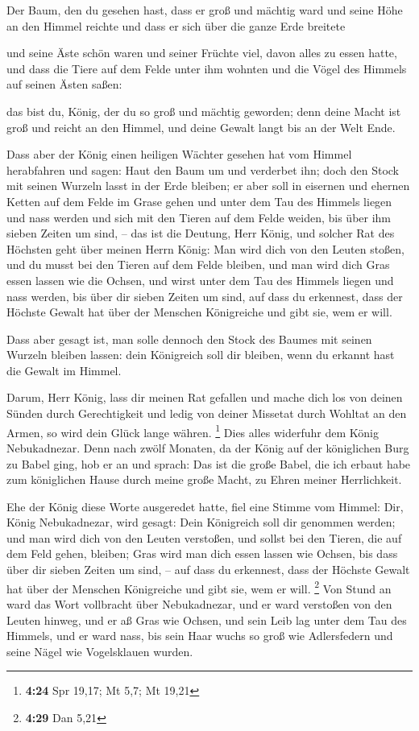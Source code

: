  Der Baum, den du gesehen hast, dass er groß und mächtig
ward und seine Höhe an den Himmel reichte und dass er sich über die
ganze Erde breitete

 und seine Äste schön waren und seiner Früchte viel,
davon alles zu essen hatte, und dass die Tiere auf dem Felde unter ihm
wohnten und die Vögel des Himmels auf seinen Ästen saßen:

 das bist du, König, der du so groß und mächtig geworden;
denn deine Macht ist groß und reicht an den Himmel, und deine Gewalt
langt bis an der Welt Ende.

 Dass aber der König einen heiligen Wächter gesehen hat
vom Himmel herabfahren und sagen: Haut den Baum um und verderbet ihn;
doch den Stock mit seinen Wurzeln lasst in der Erde bleiben; er aber
soll in eisernen und ehernen Ketten auf dem Felde im Grase gehen und
unter dem Tau des Himmels liegen und nass werden und sich mit den Tieren
auf dem Felde weiden, bis über ihm sieben Zeiten um sind, --
 das ist die Deutung, Herr König, und solcher Rat des
Höchsten geht über meinen Herrn König:  Man wird dich von
den Leuten stoßen, und du musst bei den Tieren auf dem Felde bleiben,
und man wird dich Gras essen lassen wie die Ochsen, und wirst unter dem
Tau des Himmels liegen und nass werden, bis über dir sieben Zeiten um
sind, auf dass du erkennest, dass der Höchste Gewalt hat über der
Menschen Königreiche und gibt sie, wem er will.

 Dass aber gesagt ist, man solle dennoch den Stock des
Baumes mit seinen Wurzeln bleiben lassen: dein Königreich soll dir
bleiben, wenn du erkannt hast die Gewalt im Himmel.

 Darum, Herr König, lass dir meinen Rat gefallen und
mache dich los von deinen Sünden durch Gerechtigkeit und ledig von
deiner Missetat durch Wohltat an den Armen, so wird dein Glück lange
währen. \footnote{\textbf{4:24} Spr 19,17; Mt 5,7; Mt 19,21}
 Dies alles widerfuhr dem König Nebukadnezar.
 Denn nach zwölf Monaten, da der König auf der
königlichen Burg zu Babel ging,  hob er an und sprach:
Das ist die große Babel, die ich erbaut habe zum königlichen Hause durch
meine große Macht, zu Ehren meiner Herrlichkeit.

 Ehe der König diese Worte ausgeredet hatte, fiel eine
Stimme vom Himmel: Dir, König Nebukadnezar, wird gesagt: Dein Königreich
soll dir genommen werden;  und man wird dich von den
Leuten verstoßen, und sollst bei den Tieren, die auf dem Feld gehen,
bleiben; Gras wird man dich essen lassen wie Ochsen, bis dass über dir
sieben Zeiten um sind, -- auf dass du erkennest, dass der Höchste Gewalt
hat über der Menschen Königreiche und gibt sie, wem er will. \footnote{\textbf{4:29}
  Dan 5,21}  Von Stund an ward das Wort vollbracht über
Nebukadnezar, und er ward verstoßen von den Leuten hinweg, und er aß
Gras wie Ochsen, und sein Leib lag unter dem Tau des Himmels, und er
ward nass, bis sein Haar wuchs so groß wie Adlersfedern und seine Nägel
wie Vogelsklauen wurden.


